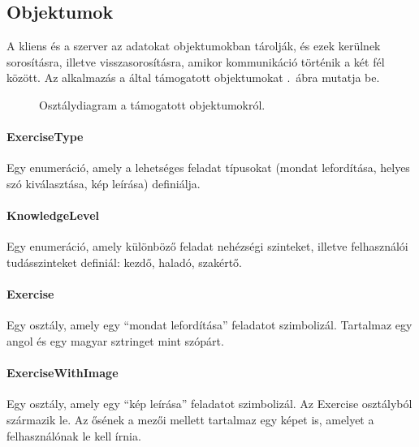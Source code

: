 \documentclass[11pt, a4paper]{article}
\begin{document}
    \subsection{Objektumok}
    A kliens és a szerver az adatokat objektumokban tárolják, és ezek kerülnek sorosításra, illetve visszasorosításra, amikor kommunikáció történik a két fél között. Az alkalmazás a által támogatott objektumokat .~ábra mutatja be.
    
    \begin{figure}[htbp]
    	\center
    	\caption{Osztálydiagram a támogatott objektumokról.}
    	\label{fig:objects-uml}
    \end{figure}
    
    \paragraph{ExerciseType} Egy enumeráció, amely a lehetséges feladat típusokat (mondat lefordítása, helyes szó kiválasztása, kép leírása) definiálja.
    
    \paragraph{KnowledgeLevel} Egy enumeráció, amely különböző feladat nehézségi szinteket, illetve felhasználói tudásszinteket definiál: kezdő, haladó, szakértő.
    
    \paragraph{Exercise} Egy osztály, amely egy ``mondat lefordítása'' feladatot szimbolizál. Tartalmaz egy angol és egy magyar sztringet mint szópárt.
    
    \paragraph{ExerciseWithImage} Egy osztály, amely egy ``kép leírása'' feladatot szimbolizál. Az Exercise osztályból származik le. Az ősének a mezői mellett tartalmaz egy képet is, amelyet a felhasználónak le kell írnia.
    
\end{document}

